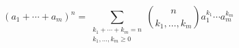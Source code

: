 \begin{thm}
\[
(a_1 + \cdots + a_m)^n = \sum_{\substack{k_1 + \cdots + k_m = n\\ k_1, \ldots, k_m \ge 0}}
\binom{n}{k_1, \ldots, k_m} a_1^{k_1} \cdots a_m^{k_m}
\]
\end{thm}